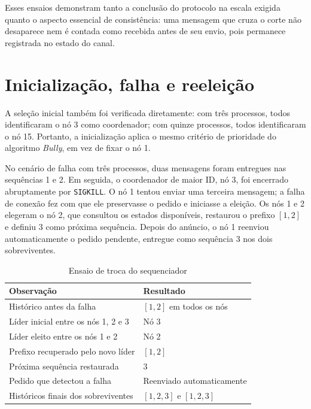 Esses ensaios demonstram tanto a conclusão do protocolo na escala exigida quanto
o aspecto essencial de consistência: uma mensagem que cruza o corte não desaparece
nem é contada como recebida antes de seu envio, pois permanece registrada no
estado do canal.

\section{Inicialização, falha e reeleição}

A seleção inicial também foi verificada diretamente: com três processos, todos
identificaram o nó 3 como coordenador; com quinze processos, todos identificaram o
nó 15. Portanto, a inicialização aplica o mesmo critério de prioridade do algoritmo \textit{Bully}, em vez de fixar o nó 1.

No cenário de falha com três processos, duas mensagens foram entregues nas
sequências 1 e 2. Em seguida, o coordenador de maior ID, nó 3, foi encerrado
abruptamente por \texttt{SIGKILL}. O nó 1 tentou enviar uma terceira mensagem; a
falha de conexão fez com que ele preservasse o pedido e iniciasse a eleição. Os
nós 1 e 2 elegeram o nó 2, que consultou os estados disponíveis, restaurou o
prefixo $[1,2]$ e definiu 3 como próxima sequência. Depois do anúncio, o nó 1
reenviou automaticamente o pedido pendente, entregue como sequência 3 nos dois
sobreviventes.

\begin{table}[H]
    \centering
    \caption{Ensaio de troca do sequenciador}
    \label{tab:teste-eleicao}
    \begin{tabular}{p{8.0cm} p{5.0cm}}
        \toprule
        \textbf{Observação} & \textbf{Resultado} \\
        \midrule
        Histórico antes da falha & $[1,2]$ em todos os nós \\
        Líder inicial entre os nós 1, 2 e 3 & Nó 3 \\
        Líder eleito entre os nós 1 e 2 & Nó 2 \\
        Prefixo recuperado pelo novo líder & $[1,2]$ \\
        Próxima sequência restaurada & 3 \\
        Pedido que detectou a falha & Reenviado automaticamente \\
        Históricos finais dos sobreviventes & $[1,2,3]$ e $[1,2,3]$ \\
        \bottomrule
    \end{tabular}
\end{table}

